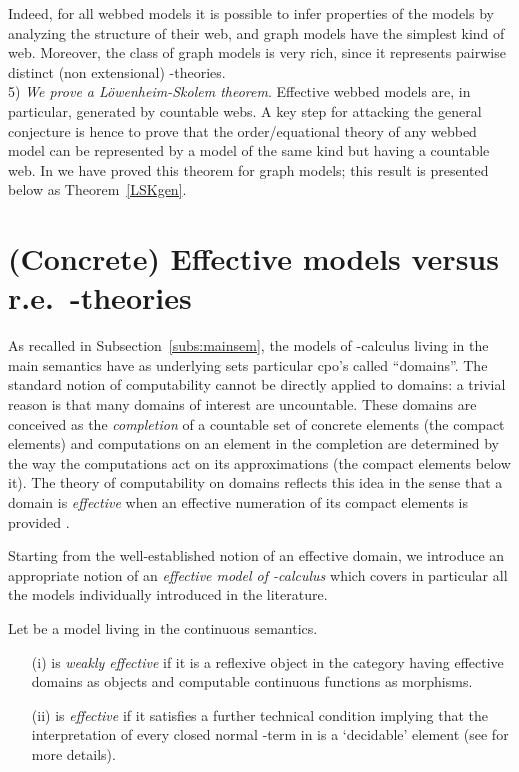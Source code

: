 \documentclass[english]{llncs}
\begin{document}
Indeed, for all webbed models it is possible to infer properties of the models by analyzing the structure of their web, 
and graph models have the simplest kind of web.
Moreover, the class of graph models is very rich, since it represents  pairwise distinct (non extensional) -theories. \\
5) \emph{We prove a L\"owenheim-Skolem theorem}. 
Effective webbed models are, in particular, generated by countable webs. 
A key step for attacking the general conjecture is hence to prove that the order/equational theory of any webbed model 
can be represented by a model of the same kind but having a countable web. 
In \cite[Chapter~5]{ManzonettoTh} we have proved this theorem for graph models; this result is presented below as Theorem~\ref{LSKgen}.

\section{(Concrete) Effective models versus r.e.\ -theories}\label{sec:(Concrete) Effective models}


As recalled in Subsection~\ref{subs:mainsem}, the models of -calculus living in the main semantics have as underlying sets particular 
cpo's called ``domains''.
The standard notion of computability cannot be directly applied to domains: a trivial reason is that many domains of interest are uncountable.
These domains are conceived as the {\em completion} of a countable set of concrete elements (the compact elements) and computations
on an element in the completion are determined by the way the computations act on its approximations (the compact elements below it).
The theory of computability on domains reflects this idea in the sense that a domain is \emph{effective} when an effective numeration of its 
compact elements is provided \cite[Ch~10, Def.~3.1]{Viggo94}.

Starting from the well-established notion of an effective domain, we introduce an appropriate notion of an {\em effective model of -calculus}
which covers in particular all the models individually introduced in the literature.

\begin{definition} Let  be a model living in the continuous semantics.
\begin{itemize}
\item[(i)]  is {\em weakly effective} if it is a reflexive object in the category having effective domains as objects and 
computable continuous functions as morphisms. 
\item[(ii)]  is {\em effective} if it satisfies a further technical condition implying that the interpretation of every
closed normal -term in  is a `decidable' element (see \cite[Def.~6.2.45]{ManzonettoTh} for more details).
\end{itemize}
\end{definition}
\end{document}
